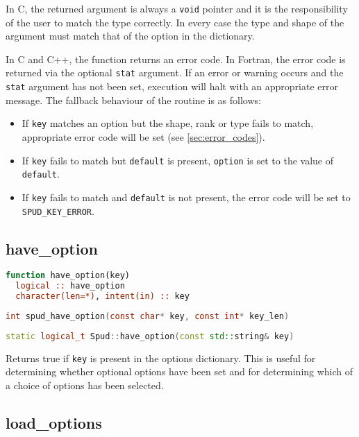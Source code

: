 \documentclass[a4paper, 11pt]{book}
\newcommand{\stat}{\lstinline[language=fortran]+stat+\xspace}
\begin{document}
In C, the returned argument is always a \lstinline+void+ pointer and it is
the responsibility of the user to match the type correctly.  In every case
the type and shape of the argument must match that of the option in the
dictionary.

In C and C++, the function returns an error code. In Fortran, the error code
is returned via the optional \stat argument. If an error or warning occurs
and the \stat argument has not been set, execution will halt with an
appropriate error message. The fallback behaviour of the routine is as follows:
\begin{itemize}
\item If \lstinline+key+ matches an option but the shape, rank or type fails
  to match, appropriate error  code will be set (see
  \ref{sec:error_codes}). 
\item If \lstinline+key+ fails to match but \lstinline+default+ is present,
  \lstinline+option+ is set to the value of \lstinline+default+.
\item If \lstinline+key+ fails to match and \lstinline+default+ is not
  present, the error code will be set to \lstinline+SPUD_KEY_ERROR+. 
\end{itemize}

\subsection{have\_option}

\begin{lstlisting}[language=fortran]
function have_option(key)
  logical :: have_option
  character(len=*), intent(in) :: key
\end{lstlisting}

\begin{lstlisting}[language=C]
int spud_have_option(const char* key, const int* key_len)
\end{lstlisting}

\begin{lstlisting}[language=C++]
static logical_t Spud::have_option(const std::string& key)
\end{lstlisting}

Returns true if \lstinline+key+ is present in the options
dictionary. This is useful for determining whether optional options have
been set and for determining which of a choice of options has been selected.

\subsection{load\_options}
\end{document}
